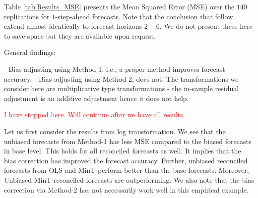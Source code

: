\documentclass[12pt]{article}
\theoremstyle{definition}
\theoremstyle{property}
\begin{document}
\begin{table}
	\caption {Average {MSE($\times 10^3$)} of base and reconciled $1$-step-ahead point forecasts are presented for log transformation and Box-Cox transformation. Unbiased(Method-1) follows from the bias adjustment via Taylor's de-biasing factor whereas Unbiased(Method-2) follows from residual mean adjustment.}
	\label{tab:Results_MSE}
	\centering
	
\end{table}



Table \ref{tab:Results_MSE} presents the Mean Squared Error (MSE) over the $140$ replications for $1$-step-ahead forecasts. Note that the conclusion that follow extend almost identically to forecast horizons $2-6$. We do not present these here to save space but they are available upon request.

General findings: 

- Bias adjusting using Method 1, i.e., a proper method improves forecast accuracy.
- Bias adjusting using Method 2, does not. The transformations we consider here are multiplicative type transformations - the in-sample residual adjustment is an additive adjustment hence it does not help. 

\textcolor{red}{I have stopped here. Will continue after we have all results.}

Let us first consider the results from log transformation. We see that the unbiased forecasts from Method-1 has less MSE compared to the biased forecasts in base level. This holds for all reconciled forecasts as well. It implies that the bias correction has improved the forecast accuracy. Further, unbiased reconciled forecasts from OLS and MinT perform better than the base forecasts. Moreover, Unbiased MinT reconciled forecasts are outperforming.
We also note that the bias correction via Method-2 has not necessarily work well in this empirical example.
\end{document}
